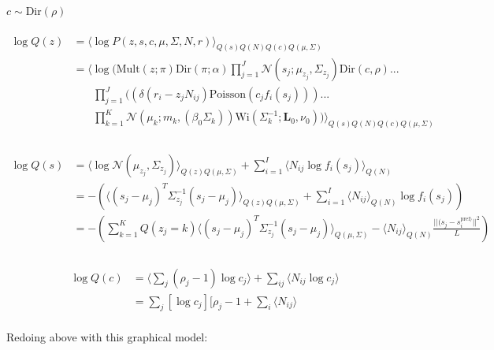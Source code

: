 \documentclass[12pt]{article}
\begin{document}
$c \sim \text{Dir} (\rho)$\\
\\
\begin{equation}
\begin{aligned}
\log Q(z) &= \langle \log P(z, s, c, \mu, \Sigma, N, r) \rangle_{Q(s)Q(N)Q(c)Q(\mu, \Sigma)}\\
&= \langle \log(\text{Mult}(z; \pi) \text{Dir}(\pi; \alpha) \prod_{j=1}^J \mathcal{N}(s_j; \mu_{z_j}, \Sigma_{z_j}) \text{Dir}(c, \rho)...\\
& \phantom{{}=1} \prod_{j=1}^J ((\delta(r_i - z_j N_{ij}) \text{Poisson}(c_j f_i(s_j)))...\\
& \phantom{{}=1} \prod_{k=1}^K \mathcal{N}(\mu_k; m_k, (\beta_0 \Sigma_k)) \text{Wi}(\Sigma_k^{-1}; \textbf{L}_0 ,\nu_0)) \rangle_{Q(s)Q(N)Q(c)Q(\mu, \Sigma)}\\
\end{aligned}
\end{equation}
\\
\begin{equation}
\begin{aligned}
\log Q(s) &= \langle \log \mathcal{N}(\mu_{z_j}, \Sigma_{z_j}) \rangle_{Q(z)Q(\mu, \Sigma)} + \sum_{i=1}^I \langle N_{ij} \log f_i(s_j) \rangle_{Q(N)}\\
&= - (\langle (s_j - \mu_j)^T \Sigma_{z_j}^{-1} (s_j - \mu_j) \rangle_{Q(z)Q(\mu, \Sigma)} + \sum_{i=1}^I \langle N_{ij} \rangle_{Q(N)} \log f_i(s_j))\\
&= - (\sum_{k=1}^K Q(z_j = k)\langle (s_j - \mu_j)^T \Sigma_{z_j}^{-1} (s_j - \mu_j) \rangle_{Q(\mu, \Sigma)} - \langle N_{ij} \rangle_{Q(N)} \frac{||(s_j - s_i^{\text{pref})}||^2}{L})\\
\end{aligned}
\end{equation}
\\
\begin{equation}
\begin{aligned}
\log Q(c) &= \langle \sum_j (\rho_j - 1) \log c_j \rangle + \sum_{ij} \langle N_{ij} \log c_j \rangle\\
&= \sum_j [\log c_j][\rho_j - 1 + \sum_i \langle N_{ij} \rangle
\end{aligned}
\end{equation}
\\
Redoing above with this graphical model:\\
\\
\end{document}
